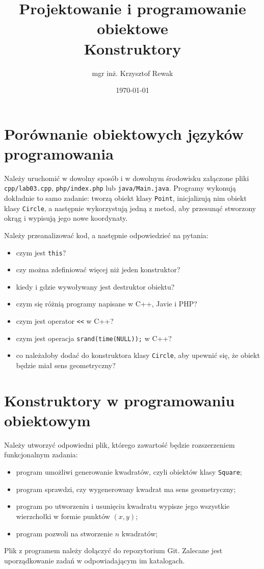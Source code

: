 \documentclass{article}
\title{
	Projektowanie i programowanie obiektowe \\
	\Huge{Konstruktory}
}
\author{mgr inż. Krzysztof Rewak}
\date{\today}
\begin{document}
	\maketitle

	\section{Porównanie obiektowych języków programowania}
	Należy uruchomić w dowolny sposób i w dowolnym środowisku załączone pliki \texttt{cpp/lab03.cpp}, \texttt{php/index.php} lub \texttt{java/Main.java}. Programy wykonują dokładnie to samo zadanie: tworzą obiekt klasy \texttt{Point}, inicjalizują nim obiekt klasy \texttt{Circle}, a następnie wykorzystują jedną z metod, aby przesunąć stworzony okrąg i wypisują jego nowe koordynaty.
	
	Należy przeanalizować kod, a następnie odpowiedzieć na pytania:
	\begin{itemize}
		\item czym jest \texttt{this}?
		\item czy można zdefiniować więcej niż jeden konstruktor?
		\item kiedy i gdzie wywoływany jest destruktor obiektu?
		\item czym się różnią programy napisane w C++, Javie i PHP?
		\item czym jest operator \texttt{<<} w C++?
		\item czym jest operacja \texttt{srand(time(NULL));} w C++?
		\item co należałoby dodać do konstruktora klasy \texttt{Circle}, aby upewnić się, że obiekt będzie miał sens geometryczny?
	\end{itemize}

	\section{Konstruktory w programowaniu obiektowym}
	Należy utworzyć odpowiedni plik, którego zawartość będzie rozszerzeniem funkcjonalnym zadania:
	\begin{itemize}
		\item program umożliwi generowanie kwadratów, czyli obiektów klasy \texttt{Square};
		\item program sprawdzi, czy wygenerowany kwadrat ma sens geometryczny;
		\item program po utworzeniu i usunięciu kwadratu wypisze jego wszystkie wierzchołki w formie punktów $(x, y)$;
		\item program pozwoli na stworzenie $n$ kwadratów;
	\end{itemize}
	
	Plik z programem należy dołączyć do repozytorium Git. Zalecane jest uporządkowanie zadań w odpowiadającym im katalogach.
\end{document}
